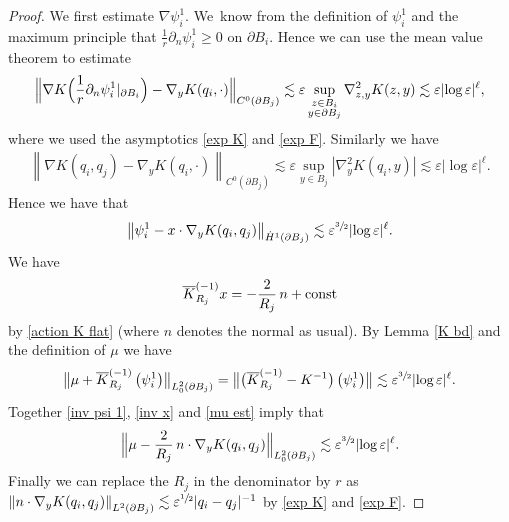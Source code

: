 \documentclass[10pt]{amsart}
\let\epsilon\varepsilon
\newcommand{\const}{\textup{const}}
\theoremstyle{definition}
\newcommand\norm[1]{\left\lVert #1\right\rVert}
\newcommand\bnorm[1]{\bigl\lVert #1\bigr\rVert}
\newcommand\Bnorm[1]{\Bigl\lVert #1\Bigr\rVert}
\newcommand\eq{=}
\let\de\partial
\let\eps\epsilon
\begin{document}
\begin{proof}
We first estimate $\nabla\psi_i^1$. We~know from the definition of $\psi_i^1$ and the maximum principle that $\frac{1}{r}\de_n\psi_i^1\geq 0$ on $\de B_i$. Hence we can use the mean value theorem to estimate\vspace*{-3pt}
\begin{equation}\label{est psi 1}
\Bnorm{\nabla K\Bigl(\frac{1}{r}\de_n\psi_i^1|_{\de B_i}\Bigr)-\nabla_y K(q_i,\cdot)}_{C^0(\de B_j)}\lesssim \eps \sup_{\substack{z\in B_i\\y\in \de B_j}}\nabla_{z,y}^2 K(z,y)\lesssim \eps|{\log\eps}|^\ell,
\end{equation}
where we used the asymptotics \eqref{exp K} and \eqref{exp F}. Similarly we have\vspace*{-3pt}
\begin{align*}
\norm{\nabla K(q_i,q_j)-\nabla_yK\left(q_i,\cdot\right)}_{C^0(\de B_j)}\lesssim \eps \sup_{y\in B_j}|\nabla_{y}^2K(q_i,y)|\lesssim \eps|{\log\eps}|^\ell.
\end{align*}
Hence we have that
\begin{align}\label{inv psi 1}
\norm{\psi_i^1-x\cdot\nabla_y K(q_i,q_j)}_{\dot{H}^1(\de B_j)}\lesssim \eps^{\sfrac{3}{2}}|{\log\eps}|^\ell.
\end{align}
We have
\begin{align}\label{inv x}
\overline{K}_{R_j}^{(-1)}x\eq-\frac{2}{R_j}\,n+\const
\end{align} by \eqref{action K flat} (where $n$ denotes the normal as usual).
By Lemma \ref{K bd} and the definition of $\mu$ we have\vspace*{-3pt}
\begin{align}\label{mu est}
\bnorm{\mu+\overline{K}_{R_j}^{(-1)}\left(\psi_i^1\right)}_{L_0^2(\de B_j)}\eq \bnorm{\bigl(\overline{K}_{R_j}^{(-1)}-K^{-1}\bigr)\left(\psi_i^1\right)}\lesssim \eps^{\sfrac{3}{2}}|{\log\eps}|^\ell.
\end{align}
Together \eqref{inv psi 1}, \eqref{inv x} and \eqref{mu est} imply that\vspace*{-3pt}
\begin{align*}
\Bnorm{\mu-\frac{2}{R_j}\,n\cdot\nabla_y K(q_i,q_j)}_{L_0^2(\de B_j)}\lesssim \eps^{\sfrac{3}{2}}|{\log\eps}|^\ell.
\end{align*}
Finally we can replace the $R_j$ in the denominator by $r$ as $\norm{n\cdot \nabla_y K(q_i,q_j)}_{L^2(\de B_j)}\lesssim \eps^{\sfrac{1}{2}}|q_i-q_j|^{-1}$ by \eqref{exp K} and \eqref{exp F}.
\end{proof}
\end{document}

